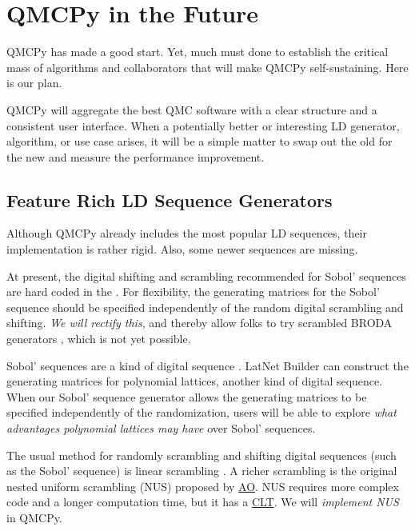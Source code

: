 \documentclass[11pt]{NSFamsart}
\newcommand{\AO}{\hyperlink{AOlink}{AO}\xspace}
\newcommand{\CLT}{\hyperlink{CLTlink}{CLT}\xspace}
\begin{document}
\section{QMCPy in the Future}
QMCPy has made a good start.  Yet, much must done to establish the critical mass of algorithms and collaborators that will make QMCPy  self-sustaining.  Here is our plan.

QMCPy will aggregate the best QMC software with a clear structure and a consistent user interface.  When a potentially better or interesting LD generator, algorithm, or use case arises, it will be a simple matter to swap out the old for the new and measure the performance improvement.

\subsection{Feature Rich LD Sequence Generators} \label{sec:richLD}
Although QMCPy already includes the most popular LD sequences, their implementation is rather rigid.  Also, some newer sequences are missing.

At present, the digital shifting and scrambling recommended for Sobol' sequences are hard coded in the  .  For flexibility, the generating matrices  for the Sobol' sequence should be specified independently of the random digital scrambling and shifting.  \emph{We will rectify this}, and thereby allow folks to try scrambled BRODA generators \cite{BRODA20a}, which is not yet possible.

Sobol' sequences are a kind of digital sequence \cite{DicPil10a}.  LatNet Builder \cite{LatNet} can construct the generating matrices for polynomial lattices,  another kind of digital sequence.  When our Sobol' sequence generator allows the  generating matrices to be specified independently of the randomization, users will be able to explore  \emph{what advantages polynomial lattices may have} over Sobol' sequences.

The usual method for randomly scrambling and shifting digital sequences (such as the Sobol' sequence) is linear scrambling \cite{Mat98,HonHic00a}.  A richer scrambling is the original nested uniform scrambling (NUS) proposed by \AO \cite{Owe95}.  NUS requires more complex code and a longer computation time, but it has a \CLT  \cite{Loh01}.  We will \emph{implement NUS} in QMCPy.
\end{document}
